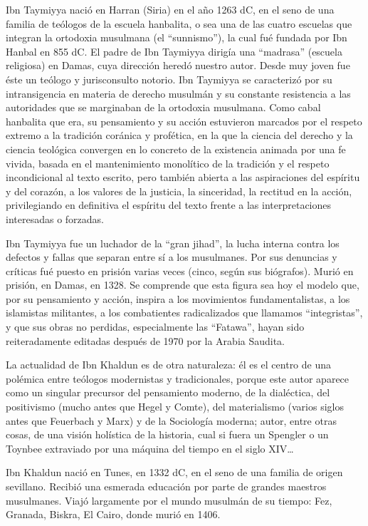 \documentclass[
]{book}
\begin{document}
Ibn Taymiyya nació en Harran (Siria) en el año 1263 dC, en el seno de una familia de teólogos de la escuela hanbalita, o sea una de las cuatro escuelas que integran la ortodoxia musulmana (el ``sunnismo''), la cual fué fundada por Ibn Hanbal en 855 dC. El padre de Ibn Taymiyya dirigía una ``madrasa'' (escuela religiosa) en Damas, cuya dirección heredó nuestro autor. Desde muy joven fue éste un teólogo y jurisconsulto notorio. Ibn Taymiyya se caracterizó por su intransigencia en materia de derecho musulmán y su constante resistencia a las autoridades que se marginaban de la ortodoxia musulmana. Como cabal hanbalita que era, su pensamiento y su acción estuvieron marcados por el respeto extremo a la tradición coránica y profética, en la que la ciencia del derecho y la ciencia teológica convergen en lo concreto de la existencia animada por una fe vivida, basada en el mantenimiento monolítico de la tradición y el respeto incondicional al texto escrito, pero también abierta a las aspiraciones del espíritu y del corazón, a los valores de la justicia, la sinceridad, la rectitud en la acción, privilegiando en definitiva el espíritu del texto frente a las interpretaciones interesadas o forzadas.

Ibn Taymiyya fue un luchador de la ``gran jihad'', la lucha interna contra los defectos y fallas que separan entre sí a los musulmanes. Por sus denuncias y críticas fué puesto en prisión varias veces (cinco, según sus biógrafos). Murió en prisión, en Damas, en 1328. Se comprende que esta figura sea hoy el modelo que, por su pensamiento y acción, inspira a los movimientos fundamentalistas, a los islamistas militantes, a los combatientes radicalizados que llamamos ``integristas'', y que sus obras no perdidas, especialmente las ``Fatawa'', hayan sido reiteradamente editadas después de 1970 por la Arabia Saudita.

La actualidad de Ibn Khaldun es de otra naturaleza: él es el centro de una polémica entre teólogos modernistas y tradicionales, porque este autor aparece como un singular precursor del pensamiento moderno, de la dialéctica, del positivismo (mucho antes que Hegel y Comte), del materialismo (varios siglos antes que Feuerbach y Marx) y de la Sociología moderna; autor, entre otras cosas, de una visión holística de la historia, cual si fuera un Spengler o un Toynbee extraviado por una máquina del tiempo en el siglo XIV\ldots{}

Ibn Khaldun nació en Tunes, en 1332 dC, en el seno de una familia de origen sevillano. Recibió una esmerada educación por parte de grandes maestros musulmanes. Viajó largamente por el mundo musulmán de su tiempo: Fez, Granada, Biskra, El Cairo, donde murió en 1406.
\end{document}
